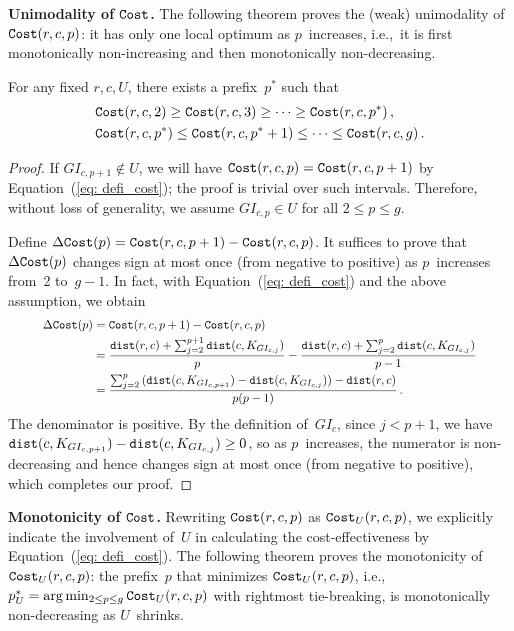 \textbf{Unimodality of $\mathtt{Cost}$.}
The following theorem proves the (weak) unimodality of~$\mathtt{Cost}(r,c,p)$: it has only one local optimum as $p$~increases, i.e.,~it is first monotonically non-increasing and then monotonically non-decreasing.

\begin{theorem}
\label{the: mono_l1}
For any fixed $r,c,U$, there exists a prefix~$p^*$ such that
    \begin{equation}
    \label{eq: mono_1}
    \begin{aligned}
    &\mathtt{Cost}(r,c,2)\geq \mathtt{Cost}(r,c,3)\geq \dots \geq \mathtt{Cost}(r,c,p^*) \,,\\
    &\mathtt{Cost}(r,c,p^*)\leq \mathtt{Cost}(r,c,p^*+1)\leq \dots \leq \mathtt{Cost}(r,c,g) \,.
    \end{aligned}
    \end{equation}
\end{theorem}
\begin{proof}
    If $GI_{c,p+1} \notin U$, we will have $\mathtt{Cost}(r,c,p)=\mathtt{Cost}(r,c,p+1)$ by Equation~(\ref{eq: defi_cost}); the proof is trivial over such intervals. Therefore, without loss of generality, we assume $GI_{c,p}\in U$ for all $2 \leq p \leq g$.

    Define $\Delta\mathtt{Cost}(p) = \mathtt{Cost}(r,c,p+1)-\mathtt{Cost}(r,c,p)$. It suffices to prove that $\Delta\mathtt{Cost}(p)$ changes sign at most once (from negative to positive) as $p$~increases from~2 to~$g-1$. In fact, with Equation~(\ref{eq: defi_cost}) and the above assumption, we obtain
    \begin{equation}
    \resizebox{0.9\linewidth}{!}{$
    \displaystyle
    \begin{aligned}
        \Delta\Cost(p) & = \Cost(r,c,p+1)-\Cost(r,c,p) \\
        & = \frac{\dist(r,c)+\sum_{j=2}^{p+1}{\dist(c,K_{GI_{c,j}})}}{p} - \frac{\dist(r,c)+\sum_{j=2}^{p}{\dist(c,K_{GI_{c,j}})}}{p-1} \\
        & = \frac{\sum_{j=2}^{p}{(\dist(c,K_{GI_{c,p+1}})-\dist(c,K_{GI_{c,j}}))}-\dist(r,c)}{p(p-1)} \,.
    \end{aligned}
    $}
    \end{equation}
    \noindent The denominator is positive. By the definition of~$GI_c$, since $j<p+1$, we have $\mathtt{dist}(c,K_{GI_{c,p+1}}) - \mathtt{dist}(c,K_{GI_{c,j}}) \geq 0$, so as $p$~increases, the numerator is non-decreasing and hence changes sign at most once (from negative to positive), which completes our proof.
\end{proof}

\textbf{Monotonicity of $\mathtt{Cost}$.}
Rewriting $\mathtt{Cost}(r,c,p)$ as $\mathtt{Cost}_U(r,c,p)$, we explicitly indicate the involvement of~$U$ in calculating the cost-effectiveness by Equation~(\ref{eq: defi_cost}). The following theorem proves the monotonicity of $\mathtt{Cost}_U(r,c,p)$: the prefix~$p$ that minimizes $\mathtt{Cost}_U(r,c,p)$, i.e.,~$p^*_U=\arg\min_{2\leq p\leq g}\mathtt{Cost}_U(r,c,p)$ with rightmost tie-breaking, is monotonically non-decreasing as $U$~shrinks.


